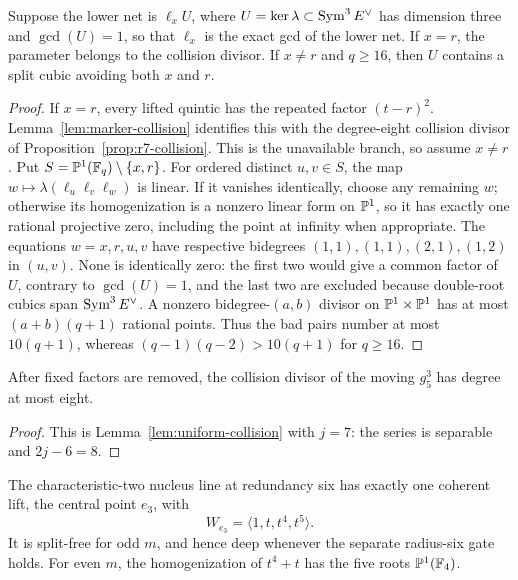 \begin{proposition}\label{prop:r7-gcd1}%
%
Suppose the lower net is $\ell_xU$, where
$U=\ker\lambda\subset\operatorname{Sym}^3E^\vee$ has dimension three and
\(\gcd(U)=1\), so that \(\ell_x\) is the exact gcd of the lower net.
If \(x=r\),
the parameter belongs to the collision divisor.  If
\(x\ne r\) and \(q\geq16\), then \(U\) contains a split cubic avoiding
both \(x\) and \(r\).
\end{proposition}

\begin{proof}
If \(x=r\), every lifted quintic has the repeated factor
\((t-r)^2\).  Lemma~\ref{lem:marker-collision} identifies this with
the degree-eight collision divisor of
Proposition~\ref{prop:r7-collision}.  This is the unavailable branch,
so assume \(x\ne r\).
Put $S=\mathbb P^1(\mathbb F_q)\setminus\{x,r\}$.  For ordered distinct
$u,v\in S$, the map
$w\mapsto\lambda(\ell_u\ell_v\ell_w)$ is linear.  If it vanishes
identically, choose any remaining $w$; otherwise its homogenization is
a nonzero linear form on \(\mathbb P^1\), so it has exactly one rational
projective zero, including the point at infinity when appropriate.
The equations $w=x,r,u,v$ have respective bidegrees
$(1,1),(1,1),(2,1),(1,2)$ in $(u,v)$.  None is identically zero:
the first two would give a common factor of \(U\), contrary to
\(\gcd(U)=1\), and the last two are excluded
because double-root cubics span $\operatorname{Sym}^3E^\vee$.  A nonzero
bidegree-$(a,b)$ divisor on $\mathbb P^1\times\mathbb P^1$ has at most
$(a+b)(q+1)$ rational points.  Thus the bad pairs number at most
$10(q+1)$, whereas $(q-1)(q-2)>10(q+1)$ for $q\geq16$.
\end{proof}

\begin{proposition}\label{prop:r7-collision}%
%
After fixed factors are removed, the collision divisor of the
moving $g^3_5$ has degree at most eight.
\end{proposition}

\begin{proof}
This is Lemma~\ref{lem:uniform-collision} with \(j=7\):
the series is separable and \(2j-6=8\).
\end{proof}

The characteristic-two nucleus line at redundancy six has exactly one
coherent lift, the central point $e_3$, with
\[
W_{e_3}=\langle1,t,t^4,t^5\rangle.
\]
It is split-free for odd \(m\), and hence deep whenever the separate
radius-six gate holds.  For even \(m\), the homogenization of
\(t^4+t\) has the five roots \(\mathbb P^1(\mathbb F_4)\).

